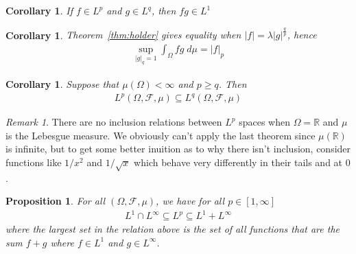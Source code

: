 \documentclass[12pt]{article}
\theoremstyle{plain}
\newtheorem{prop}[thm]{Proposition}
\newtheorem{cor}[thm]{Corollary}
\theoremstyle{definition}
\theoremstyle{remark}
\newtheorem*{rmk}{Remark}
\newcommand{\sF}{\mathscr{F}}
\begin{document}
\begin{cor}
If $f\in L^p$ and $g\in L^{q}$, then $fg\in L^1$
\end{cor}

\begin{cor}
Theorem~\ref{thm:holder} gives equality when
$|f|=\lambda |g|^{\frac{q}{p}}$, hence
\begin{align*}
    \sup_{\lvert g\rvert_{q}=1}
    \int_\Omega fg \; d\mu = \lvert f\rvert_p
\end{align*}
\end{cor}

\begin{cor}
Suppose that $\mu(\Omega)<\infty$ and $p\geq q$. Then
\begin{align*}
  L^p(\Omega,\sF,\mu)
  \subseteq
  L^q(\Omega,\sF,\mu)
\end{align*}
\end{cor}
\begin{rmk}
There are no inclusion relations between $L^p$ spaces when
$\Omega=\mathbb{R}$ and $\mu$ is the Lebesgue measure. We obviously
can't apply the last theorem since $\mu(\mathbb{R})$ is infinite, but to
get some better inuition as to why there isn't inclusion, consider
functions like $1/x^2$ and $1/\sqrt{x}$ which behave very differently in
their tails and at $0$.
\end{rmk}

\begin{prop}
For all $(\Omega,\sF,\mu)$, we have for all $p\in[1,\infty]$
\begin{align*}
  L^1 \cap L^\infty \subseteq L^p \subseteq L^1+L^\infty
\end{align*}
where the largest set in the relation above is the set of all functions
that are the sum $f+g$ where $f\in L^1$ and $g\in L^\infty$.
\end{prop}
\end{document}
